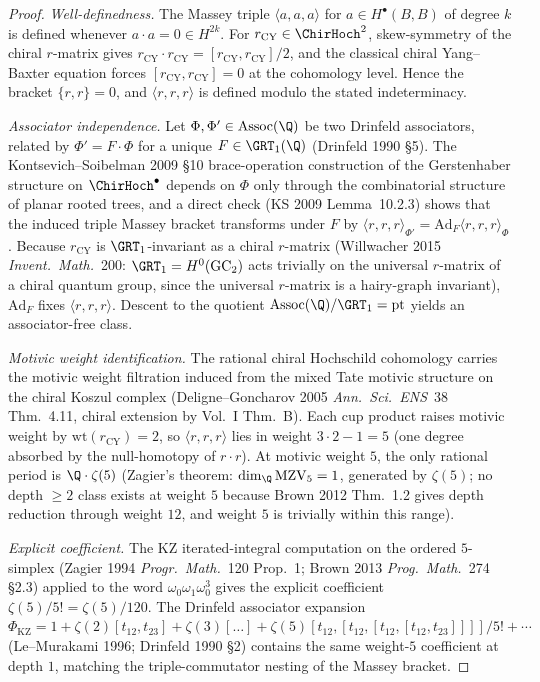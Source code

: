 \begin{proof}
\emph{Well-definedness.} The Massey triple $\langle a, a, a\rangle$ for $a \in H^\bullet(B, B)$ of degree $k$ is defined whenever $a \cdot a = 0 \in H^{2k}$. For $r_{\mathrm{CY}} \in \ChirHoch^2$, skew-symmetry of the chiral $r$-matrix gives $r_{\mathrm{CY}} \cdot r_{\mathrm{CY}} = [r_{\mathrm{CY}}, r_{\mathrm{CY}}]/2$, and the classical chiral Yang--Baxter equation forces $[r_{\mathrm{CY}}, r_{\mathrm{CY}}] = 0$ at the cohomology level. Hence the bracket $\{r, r\} = 0$, and $\langle r, r, r\rangle$ is defined modulo the stated indeterminacy.

\emph{Associator independence.} Let $\Phi, \Phi' \in \Assoc(\Q)$ be two Drinfeld associators, related by $\Phi' = F \cdot \Phi$ for a unique $F \in \GRT_1(\Q)$ (Drinfeld 1990 \S 5). The Kontsevich--Soibelman 2009 \S 10 brace-operation construction of the Gerstenhaber structure on $\ChirHoch^\bullet$ depends on $\Phi$ only through the combinatorial structure of planar rooted trees, and a direct check (KS 2009 Lemma~10.2.3) shows that the induced triple Massey bracket transforms under $F$ by $\langle r, r, r\rangle_{\Phi'} = \mathrm{Ad}_F \langle r, r, r\rangle_{\Phi}$. Because $r_{\mathrm{CY}}$ is $\GRT_1$-invariant as a chiral $r$-matrix (Willwacher 2015 \emph{Invent.\ Math.}~200: $\GRT_1 = H^0(\GC_2)$ acts trivially on the universal $r$-matrix of a chiral quantum group, since the universal $r$-matrix is a hairy-graph invariant), $\mathrm{Ad}_F$ fixes $\langle r, r, r\rangle$. Descent to the quotient $\Assoc(\Q)/\GRT_1 = \pt$ yields an associator-free class.

\emph{Motivic weight identification.} The rational chiral Hochschild cohomology carries the motivic weight filtration induced from the mixed Tate motivic structure on the chiral Koszul complex (Deligne--Goncharov 2005 \emph{Ann.\ Sci.\ ENS}~38 Thm.~4.11, chiral extension by Vol.~I Thm.~B). Each cup product raises motivic weight by $\mathrm{wt}(r_{\mathrm{CY}}) = 2$, so $\langle r, r, r\rangle$ lies in weight $3 \cdot 2 - 1 = 5$ (one degree absorbed by the null-homotopy of $r \cdot r$). At motivic weight $5$, the only rational period is $\Q\cdot\zeta(5)$ (Zagier's theorem: $\dim_\Q \MZV_5 = 1$, generated by $\zeta(5)$; no depth $\geq 2$ class exists at weight $5$ because Brown 2012 Thm.~1.2 gives depth reduction through weight $12$, and weight $5$ is trivially within this range).

\emph{Explicit coefficient.} The KZ iterated-integral computation on the ordered $5$-simplex (Zagier 1994 \emph{Progr.\ Math.}~120 Prop.~1; Brown 2013 \emph{Prog.\ Math.}~274 \S 2.3) applied to the word $\omega_0\omega_1\omega_0^3$ gives the explicit coefficient $\zeta(5)/5! = \zeta(5)/120$. The Drinfeld associator expansion $\Phi_{\mathrm{KZ}} = 1 + \zeta(2)[t_{12}, t_{23}] + \zeta(3)[\ldots] + \zeta(5)[t_{12},[t_{12}, [t_{12}, [t_{12}, t_{23}]]]]/5! + \cdots$ (Le--Murakami 1996; Drinfeld 1990 \S 2) contains the same weight-$5$ coefficient at depth $1$, matching the triple-commutator nesting of the Massey bracket.


\end{proof}

